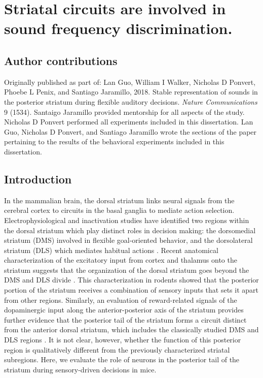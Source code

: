 \newcommand{\Muscimol}{1}
\newcommand{\MuscimolDiagram}{\Muscimol A}
\newcommand{\MuscimolExample}{\Muscimol B}
\newcommand{\MuscimolSummary}{\Muscimol C}
\newcommand{\MuscimolSites}{2}
\newcommand{\FluorescentMuscimol}{3}
\newcommand{\MuscimolMovement}{4}
\newcommand{\MuscimolNumTrials}{\MuscimolMovement A}
\newcommand{\MuscimolCoutTime}{\MuscimolMovement B}
\newcommand{\MuscimolSideInTime}{\MuscimolMovement C}

\chapter{Striatal circuits are involved in sound frequency discrimination.}

\section{Author contributions}
\noindent Originally published as part of: Lan Guo, William I Walker, Nicholas D Ponvert, Phoebe L Penix, and Santiago Jaramillo, 2018.  Stable representation of sounds in the posterior striatum during flexible auditory decisions. \textit{Nature Communications} 9 (1534).
%
Santaigo Jaramillo provided mentorship for all aspects of the study. Nicholas D Ponvert performed all experiments included in this dissertation. Lan Guo, Nicholas D Ponvert, and Santiago Jaramillo wrote the sections of the paper pertaining to the results of the behavioral experiments included in this dissertation. 

\section{Introduction}
In the mammalian brain, the dorsal striatum links neural signals from the cerebral cortex to circuits in the basal ganglia to mediate action selection. Electrophysiological and inactivation studies have identified two regions within the dorsal striatum which play distinct roles in decision making: the dorsomedial striatum (DMS) involved in flexible goal-oriented behavior, and the dorsolateral striatum (DLS) which mediates habitual actions \citep{Yin2006, Balleine2009, Devan2011}.
%
Recent anatomical characterization of the excitatory input from cortex and thalamus onto the striatum suggests that the organization of the dorsal striatum goes beyond the DMS and DLS divide \citep{Hunnicutt2016}.
%
This characterization in rodents showed that the posterior portion of the striatum receives a combination of sensory inputs that sets it apart from other regions.
%
Similarly, an evaluation of reward-related signals of the dopaminergic input along the anterior-posterior axis of the striatum provides further evidence that the posterior tail of the striatum forms a circuit distinct from the anterior dorsal striatum, which includes the classically studied DMS and DLS regions \citep{Menegas2015, Menegas2017}.
%
It is not clear, however, whether the function of this posterior region is qualitatively different from the previously characterized striatal subregions.
%
Here, we evaluate the role of neurons in the posterior tail of the striatum during sensory-driven decisions in mice.

